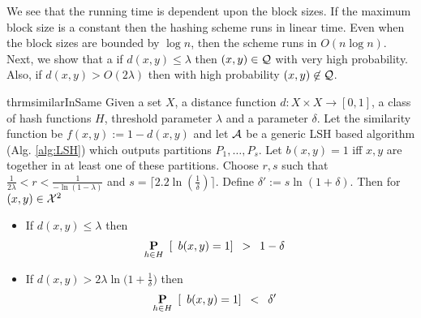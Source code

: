 \noindent We see that the running time is dependent upon the block sizes. If the maximum block size is a constant then the hashing scheme runs in linear time. Even when the block sizes are bounded by $\log n$, then the scheme runs in $O(n \log n)$.  Next, we show that a if $d(x, y) \le \lambda$ then $(x, y) \in \mathcal Q$ with very high probability. Also, if $d(x, y) > O(2\lambda)$ then with high probability $(x, y) \not\in \mathcal Q$.   

\begin{restatable}{thrm}{similarInSame}
\label{thm:similarInSame}
Given a set $X$, a distance function $d: X \times X \rightarrow [0, 1]$, a class of hash functions $H$, threshold parameter $\lambda$ and a parameter $\delta$. Let the similarity function be $f(x, y) := 1 - d(x, y)$ and let $\mathcal A$ be a generic LSH based algorithm (Alg. \ref{alg:LSH}) which outputs partitions $P_1, \ldots, P_s$. Let $b(x, y) = 1$ iff $x, y$ are together in at least one of these partitions. 
\noindent Choose $r, s$ such that $\frac{1}{2\lambda} < r < \frac{1}{-\ln(1-\lambda)} $ and $s =  \lceil 2.2\ln(\frac{1}{\delta})\rceil$. Define $\delta' := s\ln(1+\delta)$. Then for $(x, y) \in \mathcal X^2$
\begin{itemize}
	\item If $d(x, y) \le \lambda$ then 
	\begin{align*}
		& \underset{h \in H}{\mathbf P} \enspace[\enspace b(x, y) = 1 ] \enspace > \enspace 1 - \delta
	\end{align*}
	\item If $d(x, y) > 2\lambda\ln\big(1+\frac{1}{\delta}\big)$ then 
	\begin{align*}
		& \underset{h \in H}{\mathbf P} \enspace[\enspace b(x, y) = 1 ] \enspace < \enspace \delta'
	\end{align*}
\end{itemize}
\end{restatable}
